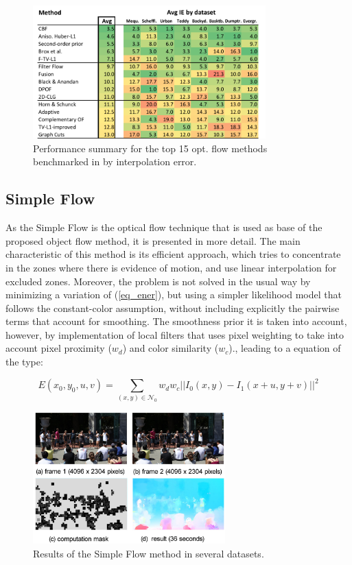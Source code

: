    \begin{figure}[thpb]
      \centering
      \includegraphics[width=0.8\textwidth]{../images/of_performance.png}
      \caption{ Performance summary for the top 15 opt. flow methods benchmarked in \cite{c17} by interpolation error. }
      \label{of_per}
   \end{figure}

\subsection{Simple Flow}

As the Simple Flow \cite{c21} is the optical flow technique that is used as base of the proposed 
object flow method, it is presented in more detail. 
The main characteristic of this method is its efficient approach, which tries to concentrate in the zones where there is evidence of motion, and use linear 
interpolation for excluded zones. 
Moreover, the problem is not solved in the usual way by minimizing a variation of (\ref{eq_ener}), but using a simpler likelihood model that 
follows the constant-color assumption, without including explicitly the pairwise terms that account for smoothing. The smoothness prior it is taken into 
account, however, by implementation of local filters that uses pixel weighting to take into account pixel proximity ($w_d$) and color similarity ($w_c$)., leading to a equation 
of the type: 

\begin{equation}
E(x_0, y_0, u, v) = \sum_{(x,y) \in \mathcal{N}_{0}} w_{d}w_{c}||  I_{0}(x,y) - I_{1}(x+u,y+v) ||^2
\label{eq_simple}
\end{equation}

   \begin{figure}[tbhp]
      \centering
      \includegraphics[width=0.66\textwidth]{../images/simpleflow.png}
      \caption{  Results of the Simple Flow method in several datasets. }
      \label{simple_of}
   \end{figure}

